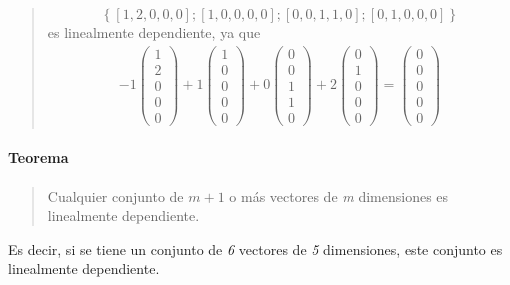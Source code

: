 \begin{quote}
  \[
    \left\{
      \left[1,2,0,0,0\right];
      \left[1,0,0,0,0\right];
      \left[0,0,1,1,0\right];
      \left[0,1,0,0,0\right]
    \right\}
  \]
  es linealmente dependiente, ya que 
  \begin{align*}
    -1\begin{pmatrix}
      1 \\ 2 \\ 0 \\ 0 \\ 0
    \end{pmatrix} + 1 \begin{pmatrix}
      1 \\ 0 \\ 0 \\ 0 \\ 0
    \end{pmatrix} + 0 \begin{pmatrix}
      0 \\ 0 \\ 1 \\ 1 \\ 0
    \end{pmatrix} + 2 \begin{pmatrix}
      0 \\ 1 \\ 0 \\ 0 \\ 0
    \end{pmatrix} = \begin{pmatrix}
      0 \\ 0 \\ 0 \\ 0 \\ 0
    \end{pmatrix}
  \end{align*}
\end{quote}

\paragraph{Teorema}

\begin{quote}
  Cualquier conjunto de \(m+1\) o más vectores de \textit{m} dimensiones es linealmente dependiente.
\end{quote}

\noindent Es decir, si se tiene un conjunto de \textit{6} vectores de \textit{5} dimensiones, este conjunto es linealmente dependiente.

